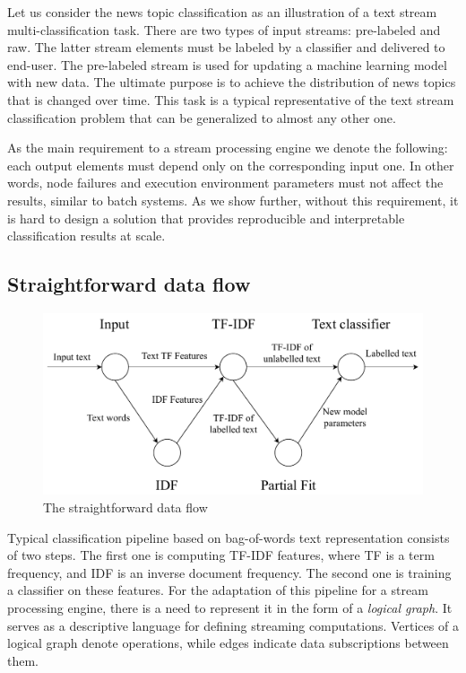 \label{fs-framework}

Let us consider the news topic classification as an illustration of a text stream multi-classification task. There are two types of input streams: pre-labeled and raw. The latter stream elements must be labeled by a classifier and delivered to end-user. The pre-labeled stream is used for updating a machine learning model with new data. The ultimate purpose is to achieve the distribution of news topics that is changed over time. This task is a typical representative of the text stream classification problem that can be generalized to almost any other one.

As the main requirement to a stream processing engine we denote the following: each output elements must depend only on the corresponding input one. In other words, node failures and execution environment parameters must not affect the results, similar to batch systems. As we show further, without this requirement, it is hard to design a solution that provides reproducible and interpretable classification results at scale.

\subsection{Straightforward data flow}

\begin{figure}[htbp]
  \centering
  \includegraphics[scale=0.48]{pics/logical-graph}
  \caption{The straightforward data flow}
  \label {logical_graph}
\end{figure}

Typical classification pipeline based on bag-of-words text representation consists of two steps. The first one is computing TF-IDF features, where TF is a term frequency, and IDF is an inverse document frequency. The second one is training a classifier on these features. For the adaptation of this pipeline for a stream processing engine, there is a need to represent it in the form of a {\em logical graph}. It serves as a descriptive language for defining streaming computations. Vertices of a logical graph denote operations, while edges indicate data subscriptions between them. 

